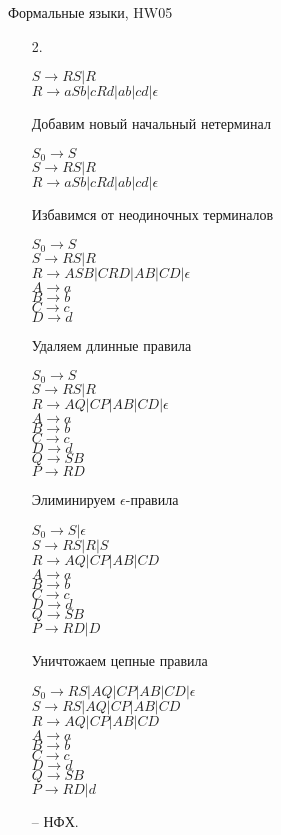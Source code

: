 \documentclass[12pt]{article}
\begin{document}
\begin{center} {\LARGE Формальные языки, HW05} \end{center}

\bigskip

\begin{enumerate}
\item[2.] \begin{myquote}
$S \to RS|R$\\
$R \to aSb|cRd|ab|cd|\epsilon$
\end{myquote}
Добавим новый начальный нетерминал
 \begin{myquote}
$S_0 \to S$\\
$S \to RS|R$\\
$R \to aSb|cRd|ab|cd|\epsilon$
\end{myquote}
Избавимся от неодиночных терминалов
\begin{myquote}
$S_0 \to S$\\
$S \to RS|R$\\
$R \to ASB|CRD|AB|CD|\epsilon$\\
$A \to a$\\
$B \to b$\\
$C \to c$\\
$D \to d$
\end{myquote}
Удаляем длинные правила
\begin{myquote}
$S_0 \to S$\\
$S \to RS|R$\\
$R \to AQ|CP|AB|CD|\epsilon$\\
$A \to a$\\
$B \to b$\\
$C \to c$\\
$D \to d$\\
$Q \to SB$\\
$P \to RD$
\end{myquote}
Элиминируем $\epsilon$-правила
\begin{myquote}
$S_0 \to S|\epsilon$\\
$S \to RS|R|S$\\
$R \to AQ|CP|AB|CD$\\
$A \to a$\\
$B \to b$\\
$C \to c$\\
$D \to d$\\
$Q \to SB$\\
$P \to RD|D$
\end{myquote}
Уничтожаем цепные правила\\
\begin{myquote}
$S_0 \to RS|AQ|CP|AB|CD|\epsilon$\\
$S \to RS|AQ|CP|AB|CD$\\
$R \to AQ|CP|AB|CD$\\
$A \to a$\\
$B \to b$\\
$C \to c$\\
$D \to d$\\
$Q \to SB$\\
$P \to RD|d$
\end{myquote} -- НФХ.
 \end{enumerate}
\end{document}
